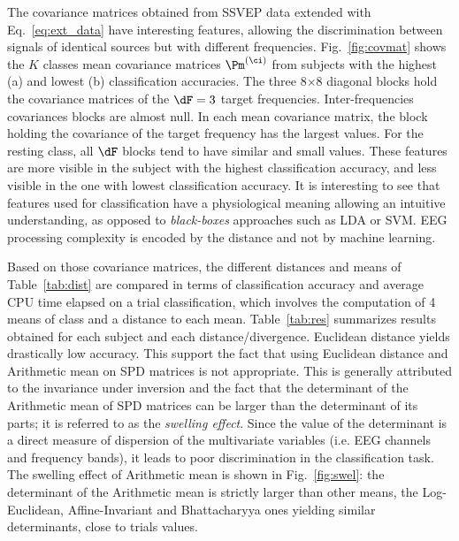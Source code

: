 The covariance matrices obtained from SSVEP data extended with Eq.~\eqref{eq:ext_data} have interesting features, allowing the discrimination between signals of identical sources but with different frequencies. 
Fig.~\ref{fig:covmat} shows the $K$ classes mean covariance matrices $\Pm^{(\ci)}$ from subjects with the highest (a) and lowest (b) classification accuracies. 
The three 8$\times$8 diagonal blocks hold the covariance matrices of the $\dF=3$ target frequencies.
Inter-frequencies covariances blocks are almost null.
In each mean covariance matrix, the block holding the covariance of the target frequency has the largest values. 
For the resting class, all $\dF$ blocks tend to have similar and small values. These features are more visible in the subject with the highest classification accuracy, and less visible in the one with lowest classification accuracy. 
It is interesting to see that features used for classification have a physiological meaning allowing an intuitive understanding, as opposed to \emph{black-boxes} approaches such as LDA or SVM. EEG processing complexity is encoded by the distance and not by machine learning.

Based on those covariance matrices, the different distances and means of Table~\ref{tab:dist} are compared in terms of classification accuracy and average CPU time elapsed on a trial classification, which involves the computation of 4 means of class and a distance to each mean.
Table~\ref{tab:res} summarizes results obtained for each subject and each distance/divergence.
Euclidean distance yields drastically low accuracy. 
This support the fact that using Euclidean distance and Arithmetic mean on SPD matrices is not appropriate. 
This is generally attributed to the invariance under inversion and the fact that the determinant of the Arithmetic mean of SPD matrices can be larger than the determinant of its parts; it is referred to as the \textit{swelling effect}.
Since the value of the determinant is a direct measure of dispersion of the multivariate variables (i.e. EEG channels and frequency bands), it leads to poor discrimination in the classification task. 
The swelling effect of Arithmetic mean is shown in Fig.~\ref{fig:swel}: the determinant of the Arithmetic mean is strictly larger than other means, the Log-Euclidean, Affine-Invariant and Bhattacharyya ones yielding similar determinants, close to trials values.

